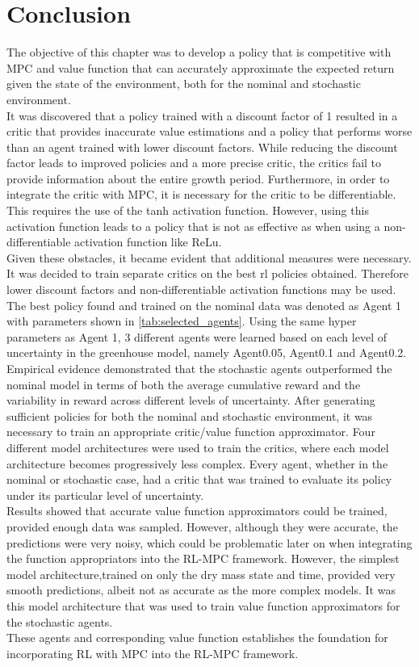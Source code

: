 \section{Conclusion}
The objective of this chapter was to develop a policy that is competitive with MPC and value function that can accurately approximate the expected return given the state of the environment, both for the nominal and stochastic environment. \\
It was discovered that a policy trained with a discount factor of 1 resulted in a critic that provides inaccurate value estimations and a policy that performs worse than an agent trained with lower discount factors. While reducing the discount factor leads to improved policies and a more precise critic, the critics fail to provide information about the entire growth period. Furthermore, in order to integrate the critic with MPC, it is necessary for the critic to be differentiable. This requires the use of the tanh activation function. However, using this activation function leads to a policy that is not as effective as when using a non-differentiable activation function like ReLu. \\
Given these obstacles, it became evident that additional measures were necessary. It was decided to train separate critics on the best rl policies obtained. Therefore lower discount factors and non-differentiable activation functions may be used. The best policy found and trained on the nominal data was denoted as Agent 1 with parameters shown in \autoref{tab:selected_agents}. Using the same hyper parameters as Agent 1, 3 different agents were learned based on each level of uncertainty in the greenhouse model, namely Agent0.05, Agent0.1 and Agent0.2. \\
Empirical evidence demonstrated that the stochastic agents outperformed the nominal model in terms of both the average cumulative reward and the variability in reward across different levels of uncertainty. After generating sufficient policies for both the nominal and stochastic environment, it was necessary to train an appropriate critic/value function approximator. Four different model architectures were used to train the critics, where each model architecture becomes progressively less complex. Every agent, whether in the nominal or stochastic case, had a critic that was trained to evaluate its policy under its particular level of uncertainty.\\
Results showed that accurate value function approximators could be trained, provided enough data was sampled. However, although they were accurate, the predictions were very noisy, which could be problematic later on when integrating the function appropriators into the RL-MPC framework. However, the simplest model architecture,trained on only the dry mass state and time, provided very smooth predictions, albeit not as accurate as the more complex models. It was this model architecture that was used to train value function approximators for the stochastic agents.\\
These agents and corresponding value function establishes the foundation for incorporating RL with MPC into the RL-MPC framework.
